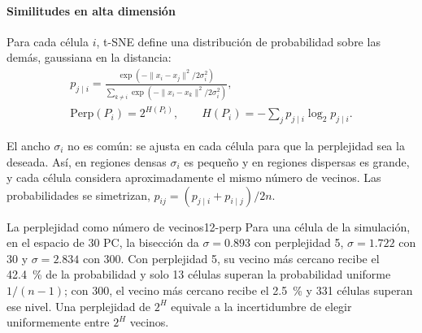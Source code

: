 \paragraph{Similitudes en alta dimensión} Para cada célula $i$, t-SNE define una distribución de probabilidad sobre las demás, gaussiana en la distancia:
\begin{equation}\label{eq:12-tsne-p}
\begin{gathered}
p_{j\mid i}=\frac{\exp\!\left(-\lVert x_i-x_j\rVert^2/2\sigma_i^2\right)}{\sum_{k\neq i}\exp\!\left(-\lVert x_i-x_k\rVert^2/2\sigma_i^2\right)},\\[2pt]
\mathrm{Perp}(P_i)=2^{H(P_i)},\qquad H(P_i)=-\sum_{j}p_{j\mid i}\log_2 p_{j\mid i}.
\end{gathered}
\end{equation}
\begin{simbolos}
\end{simbolos}
El ancho $\sigma_i$ no es común: se ajusta en cada célula para que la perplejidad sea la deseada. Así, en regiones densas $\sigma_i$ es pequeño y en regiones dispersas es grande, y cada célula considera aproximadamente el mismo número de vecinos. Las probabilidades se simetrizan, $p_{ij}=(p_{j\mid i}+p_{i\mid j})/2n$.

\begin{ejemplo}{La perplejidad como número de vecinos}{12-perp}
Para una célula de la simulación, en el espacio de 30 PC, la bisección da $\sigma=\num{0.893}$ con perplejidad 5, $\sigma=\num{1.722}$ con 30 y $\sigma=\num{2.834}$ con 300. Con perplejidad 5, su vecino más cercano recibe el \SI{42.4}{\percent} de la probabilidad y solo 13 células superan la probabilidad uniforme $1/(n-1)$; con 300, el vecino más cercano recibe el \SI{2.5}{\percent} y 331 células superan ese nivel. Una perplejidad de $2^H$ equivale a la incertidumbre de elegir uniformemente entre $2^H$ vecinos.
\end{ejemplo}

